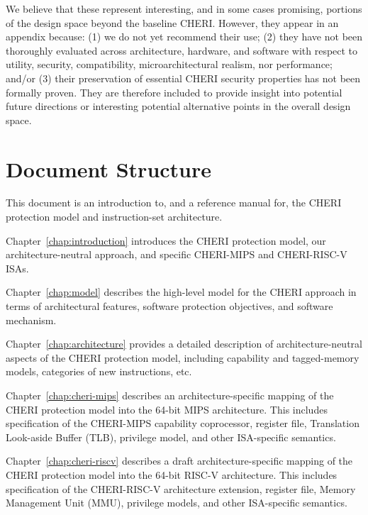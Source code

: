 We believe that these represent interesting, and in some cases promising,
portions of the design space beyond the baseline CHERI.
However, they appear in an appendix because: (1) we do not yet recommend their
use; (2) they have not been thoroughly evaluated across architecture,
hardware, and software with respect to utility, security, compatibility,
microarchitectural realism, nor performance; and/or (3) their preservation of
essential CHERI security properties has not been formally proven.
They are therefore included to provide insight into potential future
directions or interesting potential alternative points in the overall design
space.

\section{Document Structure}

This document is an introduction to, and a reference manual for, the CHERI
protection model and instruction-set architecture.

\medskip
\noindent
Chapter~\ref{chap:introduction} introduces the CHERI protection model, our
architecture-neutral approach, and specific CHERI-MIPS and CHERI-RISC-V ISAs.

\medskip
\noindent
Chapter~\ref{chap:model} describes the high-level model for the CHERI approach
in terms of architectural features, software protection objectives, and
software mechanism.

\medskip
\noindent
Chapter~\ref{chap:architecture} provides a detailed description of
architecture-neutral aspects of the CHERI protection model, including
capability and tagged-memory models, categories of new instructions, etc.

\medskip
\noindent
Chapter~\ref{chap:cheri-mips} describes an architecture-specific mapping of
the CHERI protection model into the 64-bit MIPS architecture.
This includes specification of the CHERI-MIPS capability coprocessor, register
file, Translation Look-aside Buffer (TLB), privilege model, and other
ISA-specific semantics.

\medskip
\noindent
Chapter~\ref{chap:cheri-riscv} describes  a draft architecture-specific mapping
of the CHERI protection model into the 64-bit RISC-V architecture.
This includes specification of the CHERI-RISC-V architecture extension,
register file, Memory Management Unit (MMU), privilege models, and other
ISA-specific semantics.

